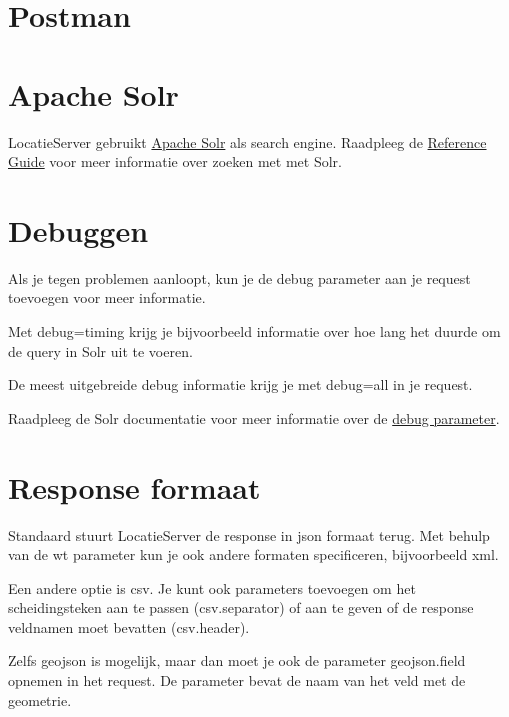 \documentclass[]{book}
\begin{document}
\hypertarget{postman}{%
\section{Postman}\label{postman}}

\hypertarget{apache-solr}{%
\section{Apache Solr}\label{apache-solr}}

LocatieServer gebruikt \href{https://lucene.apache.org/solr/}{Apache Solr} als search engine. Raadpleeg de \href{https://lucene.apache.org/solr/guide/8_3/searching.html}{Reference Guide} voor meer informatie over zoeken met met Solr.

\hypertarget{debuggen}{%
\section{Debuggen}\label{debuggen}}

Als je tegen problemen aanloopt, kun je de {debug} parameter aan je request toevoegen voor meer informatie.

Met {debug=timing} krijg je bijvoorbeeld informatie over hoe lang het duurde om de query in Solr uit te voeren.

De meest uitgebreide debug informatie krijg je met {debug=all} in je request.

Raadpleeg de Solr documentatie voor meer informatie over de \href{https://lucene.apache.org/solr/guide/8_3/common-query-parameters.html\#debug-parameter}{debug parameter}.

\hypertarget{response-formaat}{%
\section{Response formaat}\label{response-formaat}}

Standaard stuurt LocatieServer de response in {json} formaat terug. Met behulp van de {wt} parameter kun je ook andere formaten specificeren, bijvoorbeeld {xml}.

Een andere optie is {csv}. Je kunt ook parameters toevoegen om het scheidingsteken aan te passen ({csv.separator}) of aan te geven of de response veldnamen moet bevatten ({csv.header}).

Zelfs {geojson} is mogelijk, maar dan moet je ook de parameter {geojson.field} opnemen in het request. De parameter bevat de naam van het veld met de geometrie.
\end{document}
